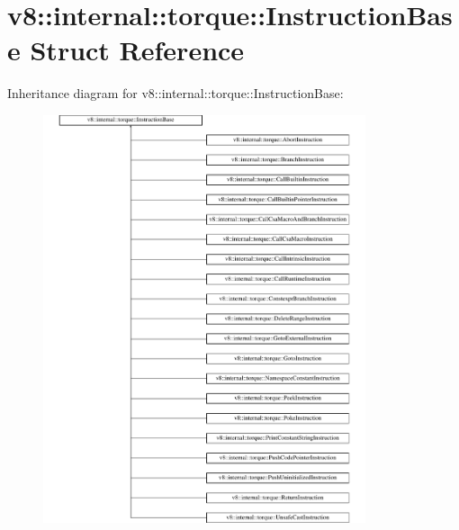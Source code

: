 \hypertarget{structv8_1_1internal_1_1torque_1_1InstructionBase}{}\section{v8\+:\+:internal\+:\+:torque\+:\+:Instruction\+Base Struct Reference}
\label{structv8_1_1internal_1_1torque_1_1InstructionBase}
Inheritance diagram for v8\+:\+:internal\+:\+:torque\+:\+:Instruction\+Base\+:\begin{figure}[H]
\begin{center}
\leavevmode
\includegraphics[height=12.000000cm]{structv8_1_1internal_1_1torque_1_1InstructionBase}
\end{center}
\end{figure}
